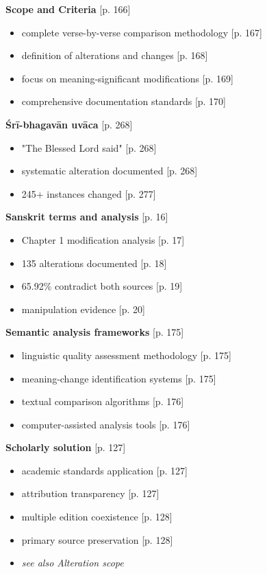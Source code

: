 \documentclass[11pt,twoside]{book}
\begin{document}
\textbf{\textbf{Scope and Criteria}} {[}p. 166]
\begin{itemize}
\item complete verse-by-verse comparison methodology [p. 167]
\item definition of alterations and changes [p. 168]
\item focus on meaning-significant modifications [p. 169]
\item comprehensive documentation standards [p. 170]
\end{itemize}

\textbf{\textbf{Śrī-bhagavān uvāca}} {[}p. 268]
\begin{itemize}
\item "The Blessed Lord said" [p. 268]
\item systematic alteration documented [p. 268]
\item 245+ instances changed [p. 277]
\end{itemize}

\textbf{\textbf{Sanskrit terms and analysis}} {[}p. 16]
\begin{itemize}
\item Chapter 1 modification analysis [p. 17]
\item 135 alterations documented [p. 18]
\item 65.92\% contradict both sources [p. 19]
\item manipulation evidence [p. 20]
\end{itemize}

\textbf{\textbf{Semantic analysis frameworks}} {[}p. 175]
\begin{itemize}
\item linguistic quality assessment methodology [p. 175]
\item meaning-change identification systems [p. 175]
\item textual comparison algorithms [p. 176]
\item computer-assisted analysis tools [p. 176]
\end{itemize}

\textbf{\textbf{Scholarly solution}} {[}p. 127]
\begin{itemize}
\item academic standards application [p. 127]
\item attribution transparency [p. 127]
\item multiple edition coexistence [p. 128]
\item primary source preservation [p. 128]

\item \emph{see also Alteration scope}
\end{itemize}
\end{document}
